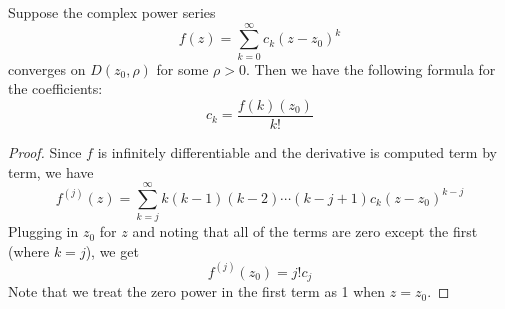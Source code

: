 \documentclass[handout]{ximera}
\begin{document}
\begin{corollary}
Suppose the complex power series
\[
f(z) = \sum_{k=0}^\infty c_k(z-z_0)^k
\]
converges on $D(z_0, \rho)$ for some $\rho > 0$. Then we have the following formula for the coefficients:
\[
c_k = \frac{f(k)(z_0)}{k!}
\]
\end{corollary}
\begin{proof}
Since $f$ is infinitely differentiable and the derivative is computed term by term, we have
\[
f^{(j)}(z) = \sum_{k=j}^\infty k(k-1)(k-2)\cdots(k-j+1)c_k(z-z_0)^{k-j}
\]
Plugging in $z_0$ for $z$ and noting that all of the terms are zero except the first (where $k = j$),
we get
\[
f^{(j)}(z_0) = j!c_j
\]
Note that we treat the zero power in the first term as 1 when $z=z_0$.
\end{proof}
\end{document}
